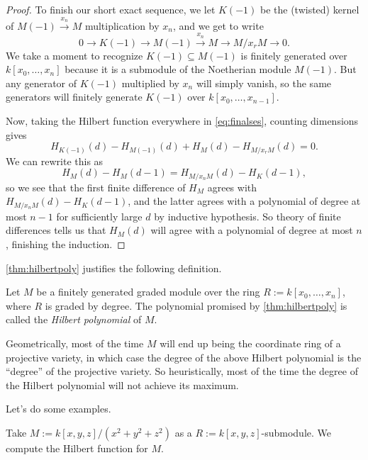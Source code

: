 \begin{proof}
	To finish our short exact sequence, we let $K(-1)$ be the (twisted) kernel of $M(-1)\stackrel{x_n}\to M$ multiplication by $x_n$, and we get to write
	\[0\to K(-1)\to M(-1)\stackrel{x_n}\to M\to M/x_rM\to 0.\label{eq:finalses}\tag{$*$}\]
	We take a moment to recognize $K(-1)\subseteq M(-1)$ is finitely generated over $k[x_0,\ldots,x_n]$ because it is a submodule of the Noetherian module $M(-1)$. But any generator of $K(-1)$ multiplied by $x_n$ will simply vanish, so the same generators will finitely generate $K(-1)$ over $k[x_0,\ldots,x_{n-1}]$.

	Now, taking the Hilbert function everywhere in \autoref{eq:finalses}, counting dimensions gives
	\[H_{K(-1)}(d)-H_{M(-1)}(d)+H_M(d)-H_{M/x_rM}(d)=0.\]
	We can rewrite this as
	\[H_M(d)-H_M(d-1)=H_{M/x_nM}(d)-H_K(d-1),\]
	so we see that the first finite difference of $H_M$ agrees with $H_{M/x_nM}(d)-H_K(d-1)$, and the latter agrees with a polynomial of degree at most $n-1$ for sufficiently large $d$ by inductive hypothesis. So theory of finite differences tells us that $H_M(d)$ will agree with a polynomial of degree at most $n$, finishing the induction.
\end{proof}
\autoref{thm:hilbertpoly} justifies the following definition.
\begin{definition}
	Let $M$ be a finitely generated graded module over the ring $R:=k[x_0,\ldots,x_n]$, where $R$ is graded by degree. The polynomial promised by \autoref{thm:hilbertpoly} is called the \textit{Hilbert polynomial} of $M$.
\end{definition}
\begin{remark}
	Geometrically, most of the time $M$ will end up being the coordinate ring of a projective variety, in which case the degree of the above Hilbert polynomial is the ``degree'' of the projective variety. So heuristically, most of the time the degree of the Hilbert polynomial will not achieve its maximum.
\end{remark}
Let's do some examples.
\begin{exe}
	Take $M:=k[x,y,z]/\left(x^2+y^2+z^2\right)$ as a $R:=k[x,y,z]$-submodule. We compute the Hilbert function for $M$.
\end{exe}
